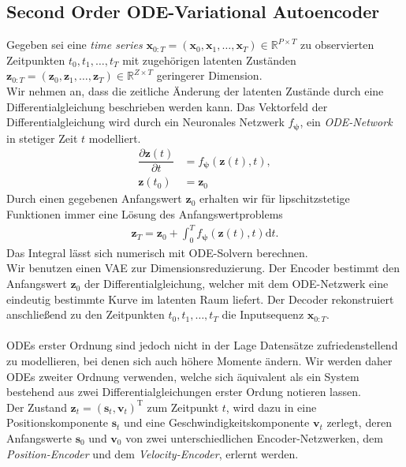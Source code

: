 \documentclass[12pt]{article}
\begin{document}
	\subsection[ODE$^2$VAE]{Second Order ODE-Variational Autoencoder}
	Gegeben sei eine \emph{time series} $\mathbf{x}_{0:T}=(\mathbf x_{0}, \mathbf x_{1}, \ldots,\mathbf x_{T})\in \mathbb{R}^{P\times T}$ zu observierten Zeitpunkten $t_{0}, t_{1},\ldots,t_{T}$ mit zugehörigen latenten Zuständen $\mathbf z_{0:T}=(\mathbf z_{0}, \mathbf z_{1}, \ldots, \mathbf z_{T})\in \mathbb{R}^{Z\times T}$ geringerer Dimension. \\
	Wir nehmen an, dass die zeitliche Änderung der latenten Zustände durch eine Differentialgleichung beschrieben werden kann. Das Vektorfeld der Differentialgleichung wird durch ein Neuronales Netzwerk $f_{\boldsymbol{\psi}}$, ein \emph{ODE-Network} in stetiger Zeit $t$ modelliert.
	\begin{align*}
	\dfrac{\partial \mathbf{z}(t)}{\partial t}&=f_{\boldsymbol{\psi}}(\mathbf{z}(t),t), \\
	\mathbf z(t_{0})&=\mathbf z_{0}
	\end{align*}
	Durch einen gegebenen Anfangswert $\mathbf z_{0}$ erhalten wir für lipschitzstetige Funktionen immer eine Lösung des Anfangswertproblems
	\begin{align*}
	\mathbf z_{T}=\mathbf z_{0} +\int_{0}^{T} f_{\boldsymbol{\psi}}(\mathbf{z}(t),t) \mathrm{d}t.
	\end{align*}
	Das Integral lässt sich numerisch mit ODE-Solvern berechnen. \\
	Wir benutzen einen VAE zur Dimensionsreduzierung. Der Encoder bestimmt den Anfangswert $\mathbf z_{0}$ der Differentialgleichung, welcher mit dem ODE-Netzwerk eine eindeutig bestimmte Kurve im latenten Raum liefert. Der Decoder rekonstruiert anschließend zu den Zeitpunkten $t_{0}, t_{1},\ldots,t_{T}$ die Inputsequenz $\mathbf x_{0:T}$. \\ \\
	ODEs erster Ordnung sind jedoch nicht in der Lage Datensätze zufriedenstellend zu modellieren, bei denen sich auch höhere Momente ändern.
	Wir werden daher ODEs zweiter Ordnung verwenden, welche sich äquivalent als ein System bestehend aus zwei Differenti\nolinebreak algleichungen erster Ordung notieren lassen.\\ Der Zustand $\mathbf z_{t}=(\mathbf s_{t}, \mathbf v_{t})^{\mathrm{T}}$ zum Zeitpunkt $t$, wird dazu in eine Positionskomponente $\mathbf s_{t}$ und eine Geschwindigkeitskomponente $\mathbf v_{t}$ zerlegt, deren Anfangswerte $\mathbf s_{0}$ und $\mathbf v_{0}$ von zwei unterschiedlichen Encoder-Netzwerken, dem \emph{Position-Encoder} und dem \emph{Velocity-Encoder}, erlernt werden.\\
\end{document}
